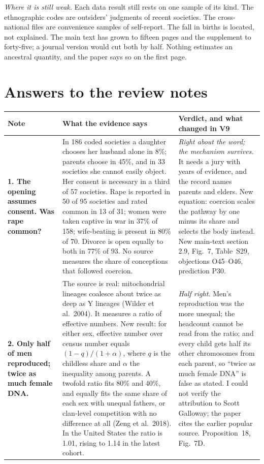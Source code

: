 \documentclass[10pt,letterpaper]{extarticle}
\newcommand{\lab}[1]{\textbf{#1}}
\begin{document}
\emph{Where it is still weak.} Each data result still rests on one sample of its kind. The ethnographic codes are outsiders'
judgments of recent societies. The cross-national files are convenience samples of self-report. The fall in births is
located, not explained. The main text has grown to fifteen pages and the supplement to forty-five; a journal version would
cut both by half. Nothing estimates an ancestral quantity, and the paper says so on the first page.

\section{Answers to the review notes}

{\small
\begin{longtable}{@{}P{0.20\textwidth}P{0.42\textwidth}P{0.31\textwidth}@{}}
\toprule
Note & What the evidence says & Verdict, and what changed in V9\\
\midrule
\endhead
\lab{1. The opening assumes consent. Was rape common?} & In 186 coded societies a daughter chooses her husband alone in 8\%; parents choose in 45\%, and in 33 societies she cannot easily object. Her consent is necessary in a third of 57 societies. Rape is reported in 50 of 95 societies and rated common in 13 of 31; women were taken captive in war in 37\% of 158; wife-beating is present in 80\% of 70. Divorce is open equally to both in 77\% of 93. No source measures the share of conceptions that followed coercion. & \emph{Right about the word; the mechanism survives.} It needs a jury with years of evidence, and the record names parents and elders. New equation: coercion scales the pathway by one minus its share and selects the body instead. New main-text section 2.9, Fig.~7, Table~S29, objections O45--O46, prediction P30.\\
\lab{2. Only half of men reproduced; twice as much female DNA.} & The source is real: mitochondrial lineages coalesce about twice as deep as Y lineages (Wilder et al.\ 2004). It measures a ratio of effective numbers. New result: for either sex, effective number over census number equals $(1-q)/(1+\alpha)$, where $q$ is the childless share and $\alpha$ the inequality among parents. A twofold ratio fits 80\% and 40\%, and equally fits the same share of each sex with unequal fathers, or clan-level competition with no difference at all (Zeng et al.\ 2018). In the United States the ratio is 1.01, rising to 1.14 in the latest cohort. & \emph{Half right.} Men's reproduction was the more unequal; the headcount cannot be read from the ratio; and every child gets half its other chromosomes from each parent, so ``twice as much female DNA'' is false as stated. I could not verify the attribution to Scott Galloway; the paper cites the earlier popular source. Proposition~18, Fig.~7D.\\

\end{longtable}}
\end{document}
